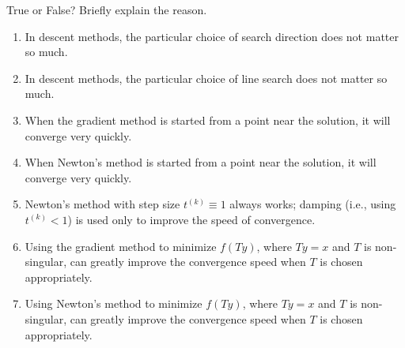 \documentclass[11pt,letter,notitlepage]{article}
\theoremstyle{definition}
\begin{document}
\begin{exercise}
True or False? Briefly explain the reason.

\begin{enumerate}[label=(\alph*)]
    \item In descent methods, the particular choice of search direction does not matter so much.
    \item In descent methods, the particular choice of line search does not matter so much.
    \item When the gradient method is started from a point near the solution, it will converge very quickly.
    \item When Newton's method is started from a point near the solution, it will converge very quickly.
    \item Newton's method with step size $t^{(k)} \equiv 1$ always works; damping (i.e., using $t^{(k)} < 1$) is used only to improve the speed of convergence.
    \item Using the gradient method to minimize $f(Ty)$, where $Ty=x$ and $T$ is non-singular, can greatly improve the convergence speed when $T$ is chosen appropriately.
    \item Using Newton's method to minimize $f(Ty)$, where $Ty=x$ and $T$ is non-singular, can greatly improve the convergence speed when $T$ is chosen appropriately.
\end{enumerate}
\end{exercise}

\newpage
\end{document}
